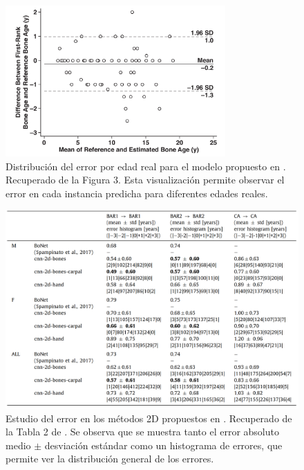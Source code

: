\begin{figure}[h]
    \centering
    \includegraphics[width=0.75\textwidth]{capitulos/cap_03/imagenes/error_distribution.png}
    \caption[
        Distribución del error por edad real para un modelo de estimación de edad. 
    ]{
        Distribución del error por edad real para el modelo propuesto en \cite{kim2017}. 
        Recuperado de la Figura 3.  
        Esta visualización permite observar el error en cada instancia predicha para diferentes edades reales. 
    }
    \label{fig:error_distribution_by_age}
\end{figure}

\begin{figure}[h]
    \centering
    \includegraphics[width=\textwidth]{capitulos/cap_03/imagenes/error_study.png}
    \caption[
        Estudio del error en métodos propuestos para la estiamción de edad.
    ]{
        Estudio del error en los métodos 2D propuestos en \cite{stern2019}. 
        Recuperado de la Tabla 2 de \cite{stern2019}. 
        Se observa que se muestra tanto el error absoluto medio $\pm$ desviación estándar como un histograma de errores, que permite ver la distribución general de los errores. 
    }
    \label{fig:error_study_stern2019}
\end{figure}


